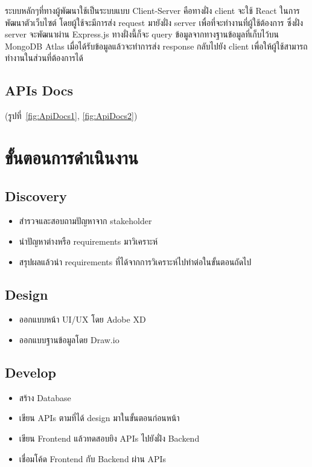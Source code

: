 ระบบหลักๆที่ทางผู้พัฒนาใช้เป็นระบบแบบ Client-Server คือทางฝั่ง client จะใช้ React ในการพัฒนาตัวเว็บไซต์ โดยผู้ใช้จะมีการส่ง request มายังฝั่ง server เพื่อที่จะทำงานที่ผู้ใช้ต้องการ ซึ่งฝั่ง server 
จะพัฒนาผ่าน Express.js ทางฝั่งนี้ก็จะ query ข้อมูลจากทางฐานข้อมูลที่เก็บไว้บน MongoDB Atlas เมื่อได้รับข้อมูลแล้วจะทำการส่ง response กลับไปยัง client เพื่อให้ผู้ใช้สามารถทำงานในส่วนที่ต้องการได้

\subsection{APIs Docs}
(รูปที่~\ref{fig:ApiDocs1}, \ref{fig:ApiDocs2})
\section{ขั้นตอนการดำเนินงาน}
\subsection{Discovery}
\begin{itemize}
  \item สำรวจและสอบถามปัญหาจาก stakeholder
  \item นำปัญหาต่างหรือ requirements มาวิเคราะห์
  \item สรุปผลแล้วนำ requirements ที่ได้จากการวิเคราะห์ไปทำต่อในขั้นตอนถัดไป
\end{itemize}

\subsection{Design}
\begin{itemize}
  \item ออกแบบหน้า UI/UX โดย Adobe XD
  \item ออกแบบฐานข้อมูลโดย Draw.io
\end{itemize}

\subsection{Develop}
\begin{itemize}
  \item สร้าง Database
  \item เขียน APIs ตามที่ได้ design มาในขั้นตอนก่อนหน้า
  \item เขียน Frontend แล้วทดสอบยิง APIs ไปยังฝั่ง Backend
  \item เชื่อมโค้ด Frontend กับ Backend ผ่าน APIs
\end{itemize}

